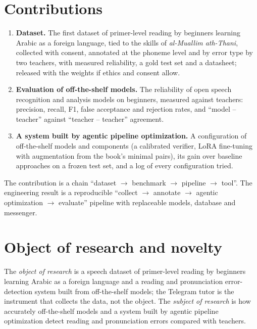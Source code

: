 \section{Contributions}

\begin{enumerate}
  \item[\textbf{C1.}] \textbf{Dataset.} The first dataset of primer-level reading by beginners learning Arabic as a
    foreign language, tied to the skills of \emph{al-Muallim ath-Thani}, collected with consent, annotated at the
    phoneme level and by error type by two teachers, with measured reliability, a gold test set and a
    datasheet; released with the weights if ethics and consent allow.
  \item[\textbf{C2.}] \textbf{Evaluation of off-the-shelf models.} The reliability of open speech recognition and
    analysis models on beginners, measured against teachers: precision, recall, F1, false acceptance and
    rejection rates, and ``model -- teacher'' against ``teacher -- teacher'' agreement.
  \item[\textbf{C3.}] \textbf{A system built by agentic pipeline optimization.} A configuration of off-the-shelf models
    and components (a calibrated verifier, LoRA fine-tuning with augmentation from the book's minimal pairs),
    its gain over baseline approaches on a frozen test set, and a log of every configuration tried.
\end{enumerate}

The contribution is a chain ``dataset $\to$ benchmark $\to$ pipeline $\to$ tool''. The engineering result is a reproducible ``collect $\to$ annotate $\to$ agentic optimization $\to$ evaluate'' pipeline
with replaceable models, database and messenger.

\section{Object of research and novelty}\label{sec:novelty}

The \emph{object of research} is a speech dataset of primer-level reading by beginners learning Arabic as a
foreign language and a reading and pronunciation error-detection system built from off-the-shelf models; the
Telegram tutor is the instrument that collects the data, not the object. The \emph{subject of research} is how
accurately off-the-shelf models and a system built by agentic pipeline optimization detect reading and pronunciation
errors compared with teachers.


